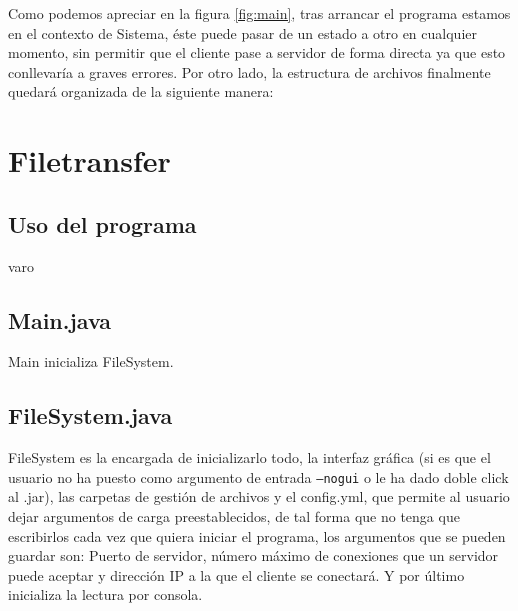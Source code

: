 \documentclass[a4paper, 12pt]{report}
\begin{document}
Como podemos apreciar en la figura \ref{fig:main}, tras arrancar el programa estamos en el contexto de Sistema, éste puede pasar de un estado a otro en cualquier momento, sin permitir que el cliente pase a servidor de forma directa ya que esto conllevaría a graves errores.
Por otro lado, la estructura de archivos finalmente quedará organizada de la siguiente manera:

\newpage
\begin{figure}
\end{figure}

\chapter{Filetransfer}
\section{Uso del programa}
varo
\section{Main.java}
Main inicializa FileSystem.
\section{FileSystem.java}
FileSystem es la encargada de inicializarlo todo, la interfaz gráfica (si es que el usuario no ha puesto como argumento de entrada \texttt{--nogui} o le ha dado doble click al .jar), las carpetas de gestión de archivos y el config.yml, que permite al usuario dejar argumentos de carga preestablecidos, de tal forma que no tenga que escribirlos cada vez que quiera iniciar el programa, los argumentos que se pueden guardar son:
Puerto de servidor, número máximo de conexiones que un servidor puede aceptar y dirección IP a la que el cliente se conectará.
Y por último inicializa la lectura por consola.
\end{document}
